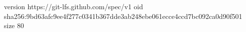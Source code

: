 version https://git-lfs.github.com/spec/v1
oid sha256:9bd63afc9ee4f277c0341b367dde3ab248ebe061ecce4ccd7bc092ca0d90f501
size 80
